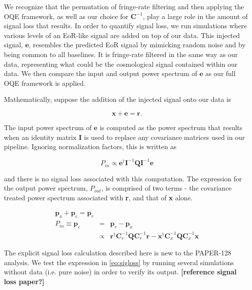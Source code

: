 \documentclass[preprint2,numberedappendix,tighten,twocolappendix]{aastex6}  %
\newcommand{\cc}[1]{{\color{purple} \textbf{[#1]}}}
\begin{document}
We recognize that the permutation of fringe-rate filtering and then applying the OQE framework, as well as our choice for $\textbf{C}^{-1}$, play a large role in the amount of signal loss that results. In order to quantify signal loss, we run simulations where various levels of an EoR-like signal are added on top of our data. This injected signal, $\textbf{e}$, resembles the predicted EoR signal by mimicking random noise and by being common to all baselines. It is fringe-rate filtered in the same way as our data, representing what could be the cosmological signal contained within our data. We then compare the input and output power spectrum of $\textbf{e}$ as our full OQE framework is applied.

Mathematically, suppose the addition of the injected signal onto our data is

\begin{equation}
\textbf{x} + \textbf{e} = \textbf{r}.
\end{equation}

The input power spectrum of $\textbf{e}$ is computed as the power spectrum that results when an identity matrix \textbf{I} is used to replace any covariance matrices used in our pipeline. Ignoring normalization factors, this is written as

\begin{equation}
P_{in} \propto \textbf{e}^{\dagger}\textbf{I}^{-1}\textbf{Q}\textbf{I}^{-1}\textbf{e}
\end{equation}

\noindent and there is no signal loss associated with this computation. The expression for the output power spectrum, $P_{out}$, is comprised of two terms - the covariance treated power spectrum associated with \textbf{r}, and that of \textbf{x} alone. 

\begin{eqnarray}
\label{eq:sigloss}
\textbf{p}_{x} + \textbf{p}_{e} = \textbf{p}_{r} \\
P_{in} \equiv \textbf{p}_{e} &=& \textbf{p}_{r}-\textbf{p}_{x} \nonumber \\
&\propto& \textbf{r}^{\dagger}\textbf{C}_{r}^{-1}\textbf{Q}\textbf{C}_{r}^{-1}\textbf{r} - \textbf{x}^{\dagger}\textbf{C}_{x}^{-1}\textbf{Q}\textbf{C}_{x}^{-1}\textbf{x} \nonumber
\end{eqnarray}

The explicit signal loss calculation described here is new to the PAPER-128 analysis. We test the expression in \eqref{eq:sigloss} by running several simulations without data (i.e. pure noise) in order to verify its output. \cc{reference signal loss paper?}
\end{document}

